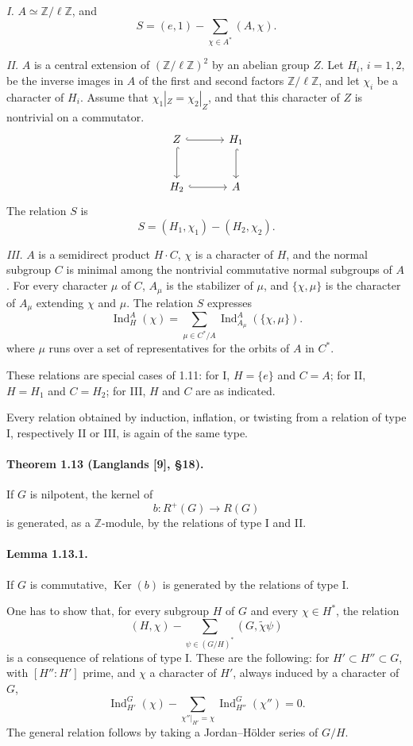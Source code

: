 \documentclass[10pt]{article}
\newcommand{\Z}{\mathbb Z}
\newcommand{\Ind}{\operatorname{Ind}}
\providecommand{\Ker}{\operatorname{Ker}}
\providecommand{\Ind}{\operatorname{Ind}}
\providecommand{\Ker}{\operatorname{Ker}}
\begin{document}
\emph{I.} \(A\simeq\Z/\ell\Z\), and
\[
S=(e,1)-\sum_{\chi\in A^*}(A,\chi).
\]

\emph{II.} \(A\) is a central extension of \((\Z/\ell\Z)^2\) by an abelian group \(Z\). Let \(H_i\), \(i=1,2\), be the inverse images in \(A\) of the first and second factors \(\Z/\ell\Z\), and let \(\chi_i\) be a character of \(H_i\). Assume that \(\chi_1|_Z=\chi_2|_Z\), and that this character of \(Z\) is nontrivial on a commutator.
\[
\begin{tikzcd}[column sep=3.2em,row sep=2.7em]
Z \arrow[r,hook] \arrow[d,hook] & H_1 \arrow[d,hook]\\
H_2 \arrow[r,hook] & A
\end{tikzcd}
\]
The relation \(S\) is
\[
S=(H_1,\chi_1)-(H_2,\chi_2).
\]

\emph{III.} \(A\) is a semidirect product \(H\cdot C\), \(\chi\) is a character of \(H\), and the normal subgroup \(C\) is minimal among the nontrivial commutative normal subgroups of \(A\). For every character \(\mu\) of \(C\), \(A_\mu\) is the stabilizer of \(\mu\), and \(\{\chi,\mu\}\) is the character of \(A_\mu\) extending \(\chi\) and \(\mu\). The relation \(S\) expresses
\[
\Ind_H^A(\chi)=
\sum_{\mu\in C^*/A}
\Ind_{A_\mu}^A(\{\chi,\mu\}).
\]
where \(\mu\) runs over a set of representatives for the orbits of \(A\) in \(C^*\).

These relations are special cases of 1.11: for I, \(H=\{e\}\) and \(C=A\); for II, \(H=H_1\) and \(C=H_2\); for III, \(H\) and \(C\) are as indicated.

Every relation obtained by induction, inflation, or twisting from a relation of type I, respectively II or III, is again of the same type.

\paragraph{Theorem 1.13 (Langlands [9], §18).} If \(G\) is nilpotent, the kernel of
\[
b:R^+(G)\longrightarrow R(G)
\]
is generated, as a \(\Z\)-module, by the relations of type I and II.

\paragraph{Lemma 1.13.1.} If \(G\) is commutative, \(\Ker(b)\) is generated by the relations of type I.

One has to show that, for every subgroup \(H\) of \(G\) and every \(\chi\in H^*\), the relation
\[
(H,\chi)-\sum_{\psi\in (G/H)^*}(G,\tilde\chi\psi)
\]
is a consequence of relations of type I. These are the following: for \(H'\subset H''\subset G\), with \([H'':H']\) prime, and \(\chi\) a character of \(H'\), always induced by a character of \(G\),
\[
\Ind_{H'}^G(\chi)-\sum_{\chi''|_{H'}=\chi}\Ind_{H''}^G(\chi'')=0.
\]
The general relation follows by taking a Jordan--Hölder series of \(G/H\).
\end{document}
